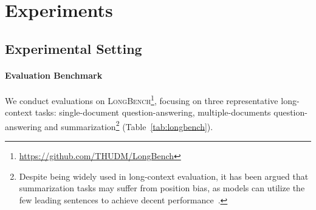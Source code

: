 \section{Experiments}
\label{sec:main_results}
\subsection{Experimental Setting}

\paragraph{Evaluation Benchmark}
We conduct evaluations on \textsc{LongBench}\footnote{\url{https://github.com/THUDM/LongBench}}, focusing on three representative long-context tasks: single-document question-answering, multiple-documents question-answering and summarization\footnote{Despite being widely used in long-context evaluation, it has been argued that summarization tasks may suffer from position bias, as models can utilize the few leading sentences to achieve decent performance~\cite{nallapati2017summarunner,li2024long}.} (Table~\ref{tab:longbench}).
